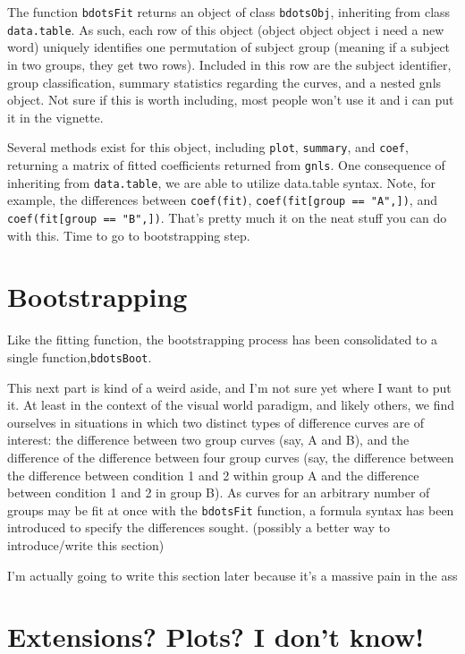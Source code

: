\documentclass{article}
\begin{document}
The function \texttt{bdotsFit} returns an object of class \texttt{bdotsObj}, inheriting from class \texttt{data.table}. As such, each row of this object (object object object i need a new word) uniquely identifies one permutation of subject group (meaning if a subject in two groups, they get two rows). Included in this row are the subject identifier, group classification, summary statistics regarding the curves, and a nested gnls object. Not sure if this is worth including, most people won't use it and i can put it in the vignette.


Several methods exist for this object, including \texttt{plot}, \texttt{summary}, and \texttt{coef}, returning a matrix of fitted coefficients returned from \texttt{gnls}. One consequence of inheriting from \texttt{data.table}, we are able to utilize data.table syntax. Note, for example, the differences between \texttt{coef(fit)}, \texttt{coef(fit[group == "A",])}, and \texttt{coef(fit[group == "B",])}. That's pretty much it on the neat stuff you can do with this. Time to go to bootstrapping step.

\section{Bootstrapping}

Like the fitting function, the bootstrapping process has been consolidated to a single function,\texttt{bdotsBoot}.

This next part is kind of a weird aside, and I'm not sure yet where I want to put it. At least in the context of the visual world paradigm, and likely others, we find ourselves in situations in which two distinct types of difference curves are of interest: the difference between two group curves (say, A and B), and the difference of the difference between four group curves (say, the difference between the difference between condition 1 and 2 within group A and the difference between condition 1 and 2 in group B). As curves for an arbitrary number of groups may be fit at once with the \texttt{bdotsFit} function, a formula syntax has been introduced to specify the differences sought. (possibly a better way to introduce/write this section) 

I'm  actually going to write this section later because it's a massive pain in the ass


\section{Extensions? Plots? I don't know!}
\end{document}
